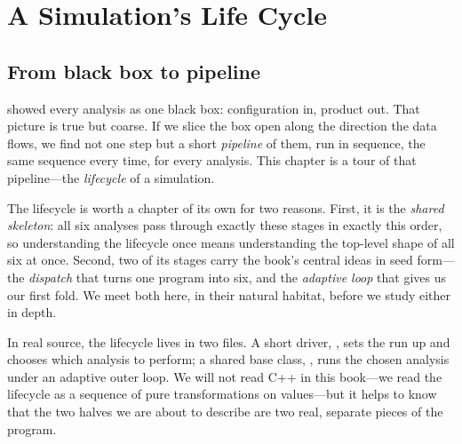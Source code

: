 \chapter{A Simulation's Life Cycle}
\label{ch:lifecycle}


\section{From black box to pipeline}

 showed every analysis as one black box: configuration in,
product out. That picture is true but coarse. If we slice the box open along the
direction the data flows, we find not one step but a short \emph{pipeline} of
them, run in sequence, the same sequence every time, for every analysis. This
chapter is a tour of that pipeline---the \emph{lifecycle} of a simulation.

The lifecycle is worth a chapter of its own for two reasons. First, it is the
\emph{shared skeleton}: all six analyses pass through exactly these stages in
exactly this order, so understanding the lifecycle once means understanding the
top-level shape of all six at once. Second, two of its stages carry the book's
central ideas in seed form---the \emph{dispatch} that turns one program into six,
and the \emph{adaptive loop} that gives us our first fold. We meet both here, in
their natural habitat, before we study either in depth.

In real source, the lifecycle lives in two files. A short driver, ,
sets the run up and chooses which analysis to perform; a shared base class,
, runs the chosen analysis under an adaptive outer loop.
We will not read C++ in this book---we read the lifecycle as a sequence of pure
transformations on values---but it helps to know that the two halves we are
about to describe are two real, separate pieces of the program.

